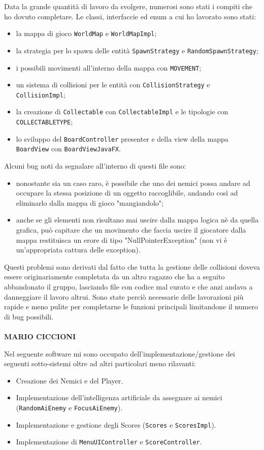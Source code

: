 \documentclass[a4paper,12pt]{report}
\begin{document}
Data la grande quantità di lavoro da svolgere, numerosi sono stati i compiti che ho dovuto completare. Le classi, interfaccie ed enum a cui ho lavorato sono stati:
\begin{itemize}
    \item la mappa di gioco \verb|WorldMap| e \verb|WorldMapImpl|;
    \item la strategia per lo spawn delle entità \verb|SpawnStrategy| e \verb|RandomSpawnStrategy|;
    \item i possibili movimenti all'interno della mappa con \verb|MOVEMENT|;
    \item un sistema di collisioni per le entità con \verb|CollisionStrategy| e \verb|CollisionImpl|;
    \item la creazione di \verb|Collectable| con \verb|CollectableImpl| e le tipologie con \verb|COLLECTABLETYPE|;
    \item lo sviluppo del \verb|BoardController| presenter e della view della mappa \verb|BoardView| con \verb|BoardViewJavaFX|.
\end{itemize}
Alcuni bug noti da segnalare all'interno di questi file sono:
\begin{itemize}
    \item nonostante sia un caso raro, è possibile che uno dei nemici possa andare ad occupare la stessa posizione di un oggetto raccoglibile, andando così ad eliminarlo dalla mappa di gioco "mangiandolo";
    \item anche se gli elementi non risultano mai uscire dalla mappa logica nè da quella grafica, può capitare che un movimento che faccia uscire il giocatore dalla mappa restituisca un erore di tipo "NullPointerException" (non vi è un'appropriata cattura delle exception).
\end{itemize}
Questi problemi sono derivati dal fatto che tutta la gestione delle collisioni doveva essere originariamente completata da un altro ragazzo che ha a seguito abbandonato il gruppo, lasciando file con codice mal curato e che anzi andava a danneggiare il lavoro altrui. Sono state perciò necessarie delle lavorazioni più rapide e meno pulite per completarne le funzioni principali limitandone il numero di bug possibili.
\\ \\
\textbf{MARIO CICCIONI}

Nel seguente software mi sono occupato dell'implementazione/gestione dei seguenti sotto-sistemi oltre ad altri particolari meno rilavanti:
\begin{itemize}
    \item Creazione dei Nemici e del Player.
    \item Implementazione dell'intelligenza artificiale da assegnare ai nemici (\verb|RandomAiEnemy| e \verb|FocusAiEnemy|).
    \item Implementazione e gestione degli Scores (\verb|Scores| e \verb|ScoresImpl|).
    \item Implementazione di \verb|MenuUIController| e \verb|ScoreController|. 
\end{itemize}
\end{document}
